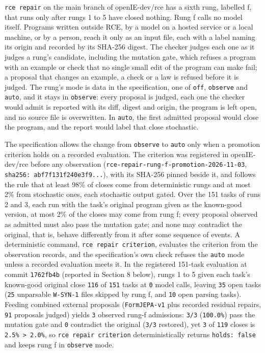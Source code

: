 \documentclass[10pt,letterpaper]{article}
\newcounter{none}
\begin{document}
\texttt{rce\ repair} on the main branch of openIE-dev/rce has a sixth
rung, labelled f, that runs only after rungs 1 to 5 have closed nothing.
Rung f calls no model itself. Programs written outside RCE, by a model
on a hosted service or a local machine, or by a person, reach it only as
an input file, each with a label naming its origin and recorded by its
SHA-256 digest. The checker judges each one as it judges a rung's
candidate, including the mutation gate, which refuses a program with an
example or check that no single small edit of the program can make fail;
a proposal that changes an example, a check or a law is refused before
it is judged. The rung's mode is data in the specification, one of
\texttt{off}, \texttt{observe} and \texttt{auto}, and it stays in
\texttt{observe}: every proposal is judged, each one the checker would
admit is reported with its diff, digest and origin, the program is left
open, and no source file is overwritten. In \texttt{auto}, the first
admitted proposal would close the program, and the report would label
that close stochastic.

The specification allows the change from \texttt{observe} to
\texttt{auto} only when a promotion criterion holds on a recorded
evaluation. The criterion was registered in openIE-dev/rce before any
observation (\texttt{rce-\allowbreak{}repair-\allowbreak{}rung-\allowbreak{}f-\allowbreak{}promotion-\allowbreak{}2026-\allowbreak{}11-\allowbreak{}03},
\texttt{sha256:\ abf7f131\allowbreak{}f240e3f9.\allowbreak{}.\allowbreak{}.\allowbreak{}}), with its SHA-256 pinned beside
it, and follows the rule that at least 98\% of closes come from
deterministic rungs and at most 2\% from stochastic ones, each
stochastic output gated. Over the 151 tasks of runs 2 and 3, each run
with the task's original program given as the known-good version, at
most 2\% of the closes may come from rung f; every proposal observed as
admitted must also pass the mutation gate; and none may contradict the
original, that is, behave differently from it after some sequence of
events. A deterministic command, \texttt{rce\ repair\ criterion},
evaluates the criterion from the observation records, and the
specification's own check refuses the \texttt{auto} mode unless a
recorded evaluation meets it. In the registered 151-task evaluation at
commit \texttt{1762fb4b} (reported in Section 8 below), rungs 1 to 5
given each task's known-good original close \texttt{116} of \texttt{151}
tasks at \texttt{0} model calls, leaving \texttt{35} open tasks
(\texttt{25} unparsable \texttt{W-SYN-1} files skipped by rung f, and
\texttt{10} open parsing tasks). Feeding combined external proposals
(\texttt{FormJEPA-\allowbreak{}v1} plus recorded residual repairs, \texttt{91}
proposals judged) yields \texttt{3} observed rung-f admissions:
\texttt{3/3} (\texttt{100.0\%}) pass the mutation gate and \texttt{0}
contradict the original (\texttt{3/3} restored), yet \texttt{3} of
\texttt{119} closes is \texttt{2.5\%\ \textgreater{}\ 2.0\%}, so
\texttt{rce\ repair\ criterion} deterministically returns
\texttt{holds:\ false} and keeps rung f in \texttt{observe} mode.
\end{document}
